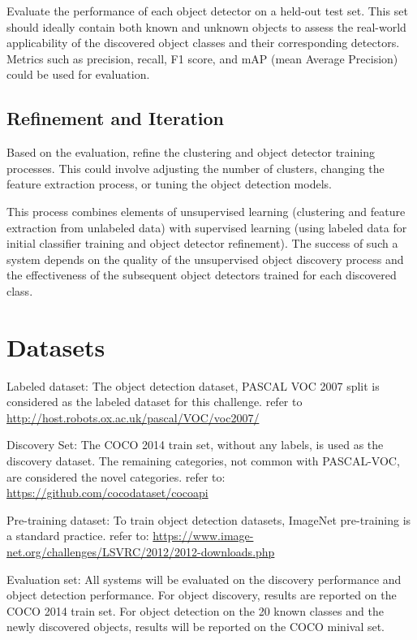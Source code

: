 \documentclass{article}
\begin{document}
	
	Evaluate the performance of each object detector on a held-out test set. This set should ideally contain both known and unknown objects to assess the real-world applicability of the discovered object classes and their corresponding detectors. Metrics such as precision, recall, F1 score, and mAP (mean Average Precision) could be used for evaluation.
	
	\subsection{Refinement and Iteration}
	
	
	Based on the evaluation, refine the clustering and object detector training processes. This could involve adjusting the number of clusters, changing the feature extraction process, or tuning the object detection models.
	
	This process combines elements of unsupervised learning (clustering and feature extraction from unlabeled data) with supervised learning (using labeled data for initial classifier training and object detector refinement). The success of such a system depends on the quality of the unsupervised object discovery process and the effectiveness of the subsequent object detectors trained for each discovered class.
	
	
	\section{Datasets}
	\label{datasets}
	
	
	Labeled dataset: The object detection dataset, PASCAL VOC 2007 split is considered as the labeled dataset for this challenge. refer to \url{http://host.robots.ox.ac.uk/pascal/VOC/voc2007/}
	
	Discovery Set: The COCO 2014 train set, without any labels, is used as the discovery dataset. The remaining categories, not common with PASCAL-VOC, are considered the novel categories. refer to: \url{https://github.com/cocodataset/cocoapi}
	
	Pre-training dataset: To train object detection datasets, ImageNet pre-training is a standard practice. refer to: \url{https://www.image-net.org/challenges/LSVRC/2012/2012-downloads.php}
	
	Evaluation set: All systems will be evaluated on the discovery performance and object detection performance. For object discovery, results are reported on the COCO 2014 train set. For object detection on the 20 known classes and the newly discovered objects, results will be reported on the COCO minival set.
	
\end{document}

